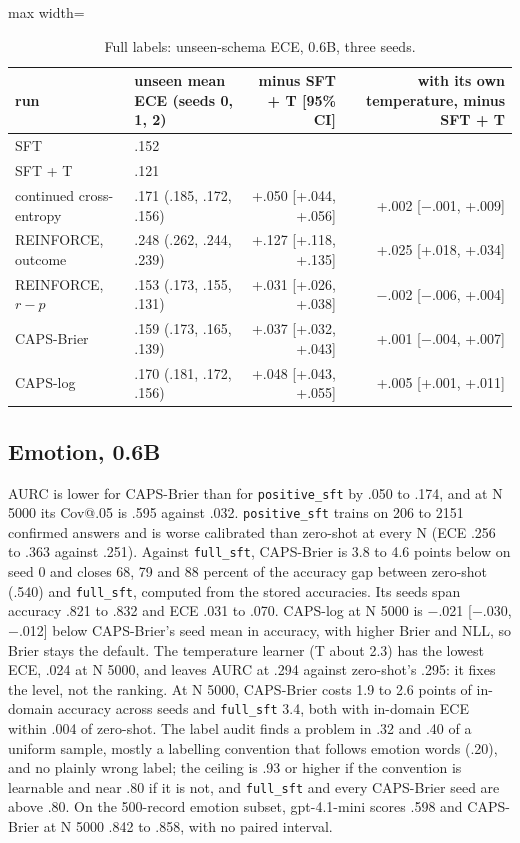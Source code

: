 \documentclass[10pt,letterpaper]{article}
\theoremstyle{plain}
\begin{document}
\begin{table}[H]
\centering
\small
\caption{Full labels: unseen-schema ECE, 0.6B, three seeds.}
\label{tab:A6}
\begin{adjustbox}{max width=\textwidth}
\begin{tabular}{llrr}
\toprule
run & unseen mean ECE (seeds 0, 1, 2) & minus SFT + T [95\% CI] & with its own temperature, minus SFT + T \\
\midrule
SFT & .152 &  &  \\
SFT + T & .121 &  &  \\
continued cross-entropy & .171 (.185, .172, .156) & +.050 [+.044, +.056] & +.002 [$-$.001, +.009] \\
REINFORCE, outcome & .248 (.262, .244, .239) & +.127 [+.118, +.135] & +.025 [+.018, +.034] \\
REINFORCE, $r - p$ & .153 (.173, .155, .131) & +.031 [+.026, +.038] & $-$.002 [$-$.006, +.004] \\
CAPS-Brier & .159 (.173, .165, .139) & +.037 [+.032, +.043] & +.001 [$-$.004, +.007] \\
CAPS-log & .170 (.181, .172, .156) & +.048 [+.043, +.055] & +.005 [+.001, +.011] \\
\bottomrule
\end{tabular}
\end{adjustbox}
\end{table}

\subsection{Emotion, 0.6B}\label{sec:A7}

AURC is lower for CAPS-Brier than for \texttt{positive\_sft} by .050 to .174, and at N 5000 its Cov@.05 is .595 against .032. \texttt{positive\_sft} trains on 206 to 2151 confirmed answers and is worse calibrated than zero-shot at every N (ECE .256 to .363 against .251). Against \texttt{full\_sft}, CAPS-Brier is 3.8 to 4.6 points below on seed 0 and closes 68, 79 and 88 percent of the accuracy gap between zero-shot (.540) and \texttt{full\_sft}, computed from the stored accuracies. Its seeds span accuracy .821 to .832 and ECE .031 to .070. CAPS-log at N 5000 is $-$.021 [$-$.030, $-$.012] below CAPS-Brier's seed mean in accuracy, with higher Brier and NLL, so Brier stays the default. The temperature learner (T about 2.3) has the lowest ECE, .024 at N 5000, and leaves AURC at .294 against zero-shot's .295: it fixes the level, not the ranking. At N 5000, CAPS-Brier costs 1.9 to 2.6 points of in-domain accuracy across seeds and \texttt{full\_sft} 3.4, both with in-domain ECE within .004 of zero-shot. The label audit finds a problem in .32 and .40 of a uniform sample, mostly a labelling convention that follows emotion words (.20), and no plainly wrong label; the ceiling is .93 or higher if the convention is learnable and near .80 if it is not, and \texttt{full\_sft} and every CAPS-Brier seed are above .80. On the 500-record emotion subset, gpt-4.1-mini scores .598 and CAPS-Brier at N 5000 .842 to .858, with no paired interval.
\end{document}
